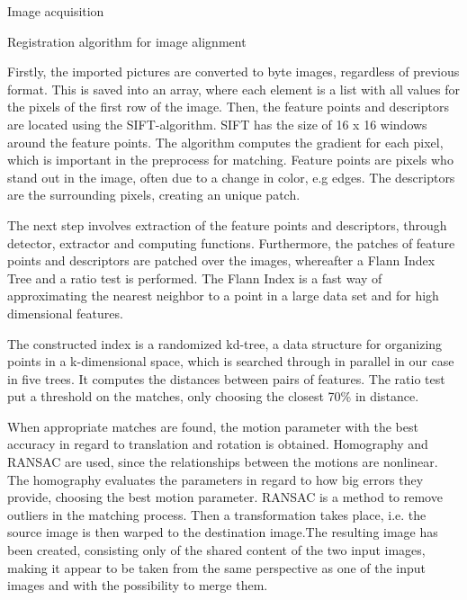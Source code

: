 \documentclass[11pt]{article}
\begin{document}
\begin{section}{Image acquisition}
\begin{subsection}{Registration algorithm for image alignment}
        \medskip

        Firstly, the imported pictures are converted to byte images, regardless of previous format. This is saved into an array, where each element is a list with all values for the pixels of the first row of the image. Then, the feature points and descriptors are located using the SIFT-algorithm. SIFT has the size of 16 x 16 windows around the feature points. The algorithm computes the gradient for each pixel, which is important in the preprocess for matching. Feature points are pixels who stand out in the image, often due to a change in color, e.g edges. The descriptors are the surrounding pixels, creating an unique patch.

        \medskip

        The next step involves extraction of the feature points and descriptors, through detector, extractor and computing functions. Furthermore, the patches of feature points and descriptors are patched over the images, whereafter a Flann Index Tree and a ratio test is performed. The Flann Index is a fast way of approximating the nearest neighbor to a point in a large data set and for high dimensional features.

        \medskip

        The constructed index is a randomized kd-tree, a data structure for organizing points in a k-dimensional space, which is searched through in parallel in our case in five trees. It computes the distances between pairs of features. The ratio test put a threshold on the matches, only choosing the closest 70\% in distance.

        \medskip

        When appropriate matches are found, the motion parameter with the best accuracy in regard to translation and rotation is obtained. Homography and RANSAC are used, since the relationships between the motions are nonlinear. The homography evaluates the parameters in regard to how big errors they provide, choosing the best motion parameter. RANSAC is a method to remove outliers in the matching process. Then a transformation takes place, i.e. the source image is then warped to the destination image.The resulting image has been created, consisting only of the shared content of the two input images, making it appear to be taken from the same perspective as one of the input images and with the possibility to merge them.

    \end{subsection} %
\end{section}
\end{document}
